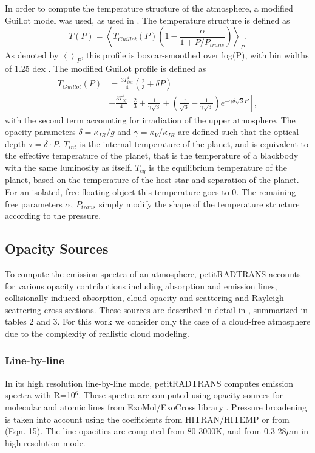 In order to compute the temperature structure of the atmosphere, a modified Guillot model \parencite{Guillot2010} was used, as used in \parencite{Molliere2017,Molliere2019}.
The temperature structure is defined as 
\begin{equation}
T(P) = \left<T_{Guillot}(P)\left(1-\frac{\alpha}{1+P/P_{trans}}\right)\right>_{P}.
\end{equation}
As denoted by $\left<\right>_{P}$, this profile is boxcar-smoothed over log(P), with bin widths of 1.25 dex \parencite{Molliere2019}. 
The modified Guillot profile is defined as
\begin{align}
T_{Guillot}(P) &= \frac{3T^{4}_{int}}{4}\left(\frac{2}{3} + \delta P\right)\\
&+\frac{3T^{4}_{eq}}{4}\left[\frac{2}{3} + \frac{1}{\gamma\sqrt{3}} + \left(\frac{\gamma}{\sqrt{3}} - \frac{1}{\gamma\sqrt{3}}\right)e^{-\gamma\delta\sqrt{3}P}\right],
\end{align}
with the second term accounting for irradiation of the upper atmosphere.
The opacity parameters $\delta=\kappa_{IR}/g$ and  $\gamma=\kappa_{V}/\kappa_{IR}$ are defined such that the optical depth $\tau=\delta\cdot P$. 
$T_{int}$ is the internal temperature of the planet, and is equivalent to the effective temperature of the planet, that is the temperature of a blackbody with the same luminosity as itself.
$T_{eq}$ is the equilibrium temperature of the planet, based on the temperature of the host star and separation of the planet. 
For an isolated, free floating object this temperature goes to 0.
The remaining free parameters $\alpha$, $P_{trans}$ simply modify the shape of the temperature structure according to the pressure.

\subsection{Opacity Sources}
To compute the emission spectra of an atmosphere, petitRADTRANS accounts for various opacity contributions including absorption and emission lines, collisionally induced absorption, cloud opacity and scattering and Rayleigh scattering cross sections. These sources are described in detail in \parencite{Molliere2019}, summarized in tables 2 and 3. For this work we consider only the case of a cloud-free atmosphere due to the complexity of realistic cloud modeling.
\subsubsection{Line-by-line}
In its high resolution line-by-line mode, petitRADTRANS computes emission spectra with R=10$^{6}$. 
These spectra are computed using opacity sources for molecular and atomic lines from ExoMol/ExoCross library \parencite{Yurchenko2018}. Pressure broadening is taken into account using the coefficients from HITRAN/HITEMP \parencite{Rothman2010,Rothman2013} or from \parencite{Sharp2007} (Eqn. 15). The line opacities are computed from 80-3000K, and from 0.3-28$\mu$m in high resolution mode.
